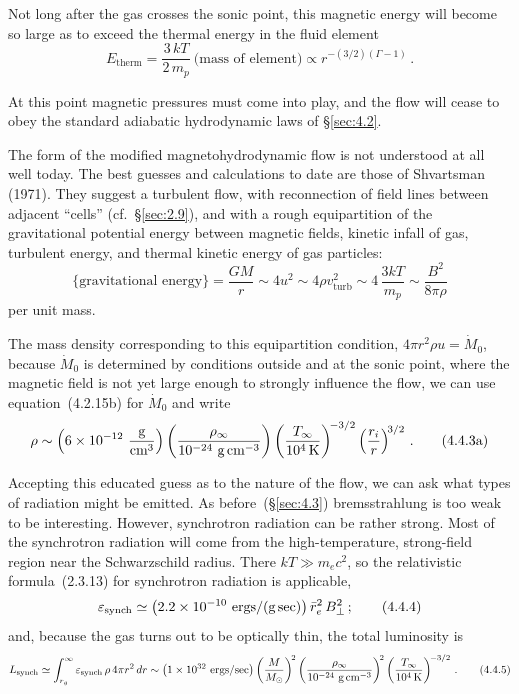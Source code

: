 Not long after the gas crosses the sonic point, this magnetic energy will become
so large as to exceed the thermal energy in the fluid element
%
\begin{equation}
E_{\mathrm{therm}}
= \frac{3\,kT}{2\,m_p}~\text{(mass of element)}
\propto r^{-(3/2)(\Gamma-1)}\,.
\tag{4.4.2a}
\end{equation}

At this point magnetic pressures must come into play, and the flow will cease
to obey the standard adiabatic hydrodynamic laws of \S\ref{sec:4.2}.

The form of the modified magnetohydrodynamic flow is not understood at
all well today.  The best guesses and calculations to date are those of Shvartsman
(1971).  They suggest a turbulent flow, with reconnection of field lines between
adjacent ``cells'' (cf.\ \S\ref{sec:2.9}), and with a rough equipartition of the gravitational
potential energy between magnetic fields, kinetic infall of gas, turbulent energy,
and thermal kinetic energy of gas particles:
%
\begin{equation}
\bigl\{\text{gravitational energy}\bigr\}
= \frac{GM}{r}
\sim 4u^2
\sim 4\rho v_{\mathrm{turb}}^2
\sim 4\,\frac{3kT}{m_p}
\sim \frac{B^2}{8\pi\rho}
\tag{4.4.2b}
\end{equation}
%
per unit mass.

The mass density corresponding to this equipartition condition,
$4\pi r^2 \rho u = \dot{M}_0$, because $\dot{M}_0$ is determined by conditions
outside and at the sonic point, where the magnetic field is not yet large enough
to strongly influence the flow, we can use equation~(4.2.15b) for $\dot{M}_0$ and write
%
\begin{equation}
\rho
\sim \left(6 \times 10^{-12}~\frac{\text{g}}{\text{cm}^3}\right)
  \left(\frac{\rho_\infty}{10^{-24}~\text{g\,cm}^{-3}}\right)
  \left(\frac{T_\infty}{10^4\,\text{K}}\right)^{\!-3/2}
  \left(\frac{r_i}{r}\right)^{\!3/2}\,.
\tag{4.4.3a}
\end{equation}

Accepting this educated guess as to the nature of the flow, we can ask what
types of radiation might be emitted.  As before~(\S\ref{sec:4.3}) bremsstrahlung is too weak
to be interesting.  However, synchrotron radiation can be rather strong.  Most of
the synchrotron radiation will come from the high-temperature, strong-field
region near the Schwarzschild radius.  There $kT \gg m_e c^2$, so the relativistic
formula~(2.3.13) for synchrotron radiation is applicable,
%
\begin{equation}
\varepsilon_{\mathrm{synch}}
\simeq \bigl(2.2 \times 10^{-10}~\text{ergs}/(\text{g\,sec})\bigr)\,
  \bar{r}_e^2\, B_\perp^2\,;
\tag{4.4.4}
\end{equation}
%
and, because the gas turns out to be optically thin, the total luminosity is
%
\begin{equation}
L_{\mathrm{synch}}
\simeq \int_{r_g}^{\infty}\varepsilon_{\mathrm{synch}}\,\rho\, 4\pi r^2\, dr
\sim \bigl(1 \times 10^{32}~\text{ergs}/\text{sec}\bigr)
  \left(\frac{M}{M_\odot}\right)^{\!2}
  \left(\frac{\rho_\infty}{10^{-24}~\text{g\,cm}^{-3}}\right)^{\!2}
  \left(\frac{T_\infty}{10^4\,\text{K}}\right)^{\!-3/2}\,.
\tag{4.4.5}
\end{equation}


